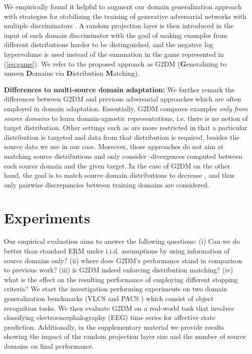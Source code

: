\documentclass{article}
\makeatletter
\newcommand\footnoteref[1]{\protected@xdef\@thefnmark{\ref{#1}}\@footnotemark}
\makeatother
\begin{document}
We empirically found it helpful to augment our domain generalization approach with strategies for stabilizing the training of generative adversarial networks with multiple discriminators \cite{neyshabur2017stabilizing, albuquerque2019multi}. A random projection layer is then introduced in the input of each domain discriminator with the goal of making examples from different distributions harder to be distinguished, and the negative log hypervolume is used instead of the summation in the game represented in (\ref{eq:game})\footnoteref{fn:supmat}. We refer to the proposed approach as G2DM (\textbf{G}eneralizing to unseen \textbf{D}omains via \textbf{D}istribution \textbf{M}atching).

\textbf{Differences to multi-source domain adaptation:} We further remark the differences between G2DM and previous adversarial approaches which are often employed in domain adaptation. Essentially, G2DM compares examples \emph{only from source domains} to learn domain-agnostic representations, i.e. there is no notion of target distribution. Other settings such as \cite{zhao2018adversarial} are more restricted in that a particular distribution is targeted and data from that distribution is required, besides the source data we use in our case. Moreover, those approaches do not aim at matching source distributions and only consider -divergences computed between each source domain and the given target. In the case of G2DM on the other hand, the goal is to match source domain distributions to decrease , and thus only pairwise discrepancies between training domains are considered. 

\section{Experiments}\label{sec:res}
Our empirical evaluation aims to answer the following questions: (i) Can we do better than standard ERM under i.i.d. assumptions by using information of source domains only? (ii) where does G2DM's performance stand in comparison to previous work? (iii) is G2DM indeed enforcing distribution matching? (iv) what is the effect on the resulting performance of employing different stopping criteria? We start the investigation performing experiments on two domain generalization benchmarks (VLCS \cite{fang2013unbiased} and PACS \cite{li2017deeper}) which consist of object recognition tasks. We then evaluate G2DM on a real-world task that involves classifying electroencephalography (EEG) time series for affective state prediction. Additionally, in the supplementary material we provide results showing the impact of the random projection layer size and the number of source domains on final performance.
\end{document}

